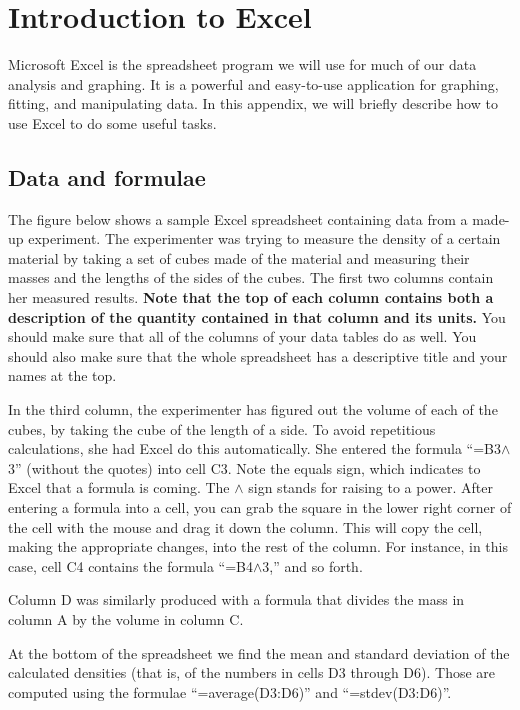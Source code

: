 
\section{Introduction to Excel}

Microsoft Excel is the spreadsheet program we will use for much of our
data analysis and graphing.  It is a powerful and easy-to-use
application for graphing, fitting, and manipulating data. In this
appendix, we will briefly describe how to use Excel to do some useful
tasks.  

\subsection{Data and formulae}

The figure below shows a sample Excel spreadsheet containing data
from a made-up experiment.  The experimenter was trying to measure
the density of a certain material by taking a set of cubes
made of the material and measuring their masses and the lengths of
the sides of the cubes.  The first two columns contain her measured
results.  \textbf{Note that the top of each column contains both
a description of the quantity contained in that column and its units.}
You should make sure that all of the columns of your data tables do as well.
You should also make sure that the whole spreadsheet has a descriptive
title and your names at the top.

In the third column, the experimenter has figured out the volume
of each of the cubes, by taking the cube of the length of a side.
To avoid repetitious calculations, she had Excel do this automatically.
She entered the formula ``=B3$\wedge$3'' (without the quotes) into cell C3.
Note the equals sign, which indicates to Excel that a formula is coming.
The $\wedge$ sign stands for raising to a power.  After entering a formula
into a cell, you can grab the square in the lower right corner of the
cell with the mouse and drag it down the column.  This will copy
the cell, making the appropriate changes, into the rest of the column.
For instance, in this case, cell C4 contains the formula ``=B4$\wedge$3,''
and so forth.

Column D was similarly produced with a formula that divides the
mass in column A by the volume in column C.

At the bottom of the spreadsheet we find the mean and standard
deviation of the calculated densities (that is, of the numbers
in cells D3 through D6).  Those are computed
using the formulae ``=average(D3:D6)'' and ``=stdev(D3:D6)''.

